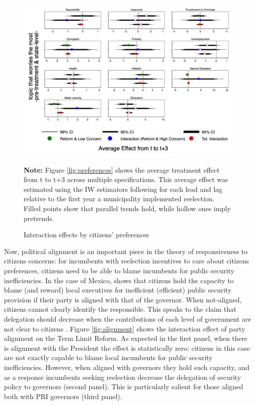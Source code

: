 \documentclass[12pt]{amsart}
\numberwithin{equation}{section}
\theoremstyle{definition}
\theoremstyle{definition}
\theoremstyle{definition}
\begin{document}
\begin{figure}[H]   
\centering
 \caption{Interaction effects by citizens' preferences}
 \label{fig:preferences_all}
\includegraphics[width=1\textwidth]{../Figures/preferences.png}
       \captionsetup{justification=centering}
       
 \textbf{Note:} Figure \ref{fig:preferences} shows the average treatment effect from t to t+3 across multiple specifications. This average effect was estimated using the IW estimators following \citet{abraham_sun_2020} for each lead and lag relative to the first year a municipality implemented reelection. Filled points show that parallel trends hold, while hollow ones imply pretrends.  
\end{figure} 
  
Now, political alignment is an important piece in the theory of responsiveness to citizens concerns: for incumbents with reelection incentives to care about citizens preferences, citizens need to be able to blame incumbents for public security inefficiencies. In the case of Mexico, \citet{ley_2017} shows that citizens hold the capacity to blame (and reward) local executives for inefficient (efficient) public security provision if their party is aligned with that of the governor. When not-aligned, citizens cannot clearly identify the responsible. This speaks to the claim that delegation should decrease when the contributions of each level of government are not clear to citizens \citep{treisman_2000}. Figure \ref{fig:alignment} shows the interaction effect of party alignment on the Term Limit Reform. As expected in the first panel, when there is alignment with the President the effect is statistically zero: citizens in this case are not exactly capable to blame local incumbents for public security inefficiencies. However, when aligned with governors they hold such capacity, and as a response incumbents seeking reelection decrease the delegation of security policy to governors (second panel). This is particularly salient for those aligned both with PRI governors (third panel). 
\end{document}
